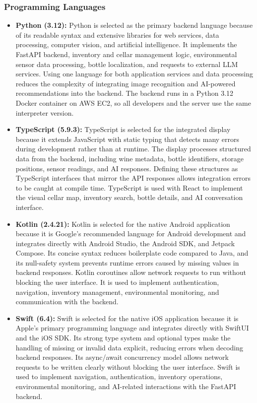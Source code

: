 \documentclass[conference]{IEEEtran}
\begin{document}
\subsubsection{Programming Languages}
\begin{itemize}
    \item \textbf{Python (3.12):} Python is selected as the primary backend language because of its readable syntax and extensive libraries for web services, data processing, computer vision, and artificial intelligence. It implements the FastAPI backend, inventory and cellar management logic, environmental sensor data processing, bottle localization, and requests to external LLM services. Using one language for both application services and data processing reduces the complexity of integrating image recognition and AI-powered recommendations into the backend. The backend runs in a Python 3.12 Docker container on AWS EC2, so all developers and the server use the same interpreter version.
    \item \textbf{TypeScript (5.9.3):} TypeScript is selected for the integrated display because it extends JavaScript with static typing that detects many errors during development rather than at runtime. The display processes structured data from the backend, including wine metadata, bottle identifiers, storage positions, sensor readings, and AI responses. Defining these structures as TypeScript interfaces that mirror the API responses allows integration errors to be caught at compile time. TypeScript is used with React to implement the visual cellar map, inventory search, bottle details, and AI conversation interface.
    \item \textbf{Kotlin (2.4.21):} Kotlin is selected for the native Android application because it is Google's recommended language for Android development and integrates directly with Android Studio, the Android SDK, and Jetpack Compose. Its concise syntax reduces boilerplate code compared to Java, and its null-safety system prevents runtime errors caused by missing values in backend responses. Kotlin coroutines allow network requests to run without blocking the user interface. It is used to implement authentication, navigation, inventory management, environmental monitoring, and communication with the backend.
    \item \textbf{Swift (6.4):} Swift is selected for the native iOS application because it is Apple's primary programming language and integrates directly with SwiftUI and the iOS SDK. Its strong type system and optional types make the handling of missing or invalid data explicit, reducing errors when decoding backend responses. Its async/await concurrency model allows network requests to be written clearly without blocking the user interface. Swift is used to implement navigation, authentication, inventory operations, environmental monitoring, and AI-related interactions with the FastAPI backend.

\end{itemize}
\end{document}
